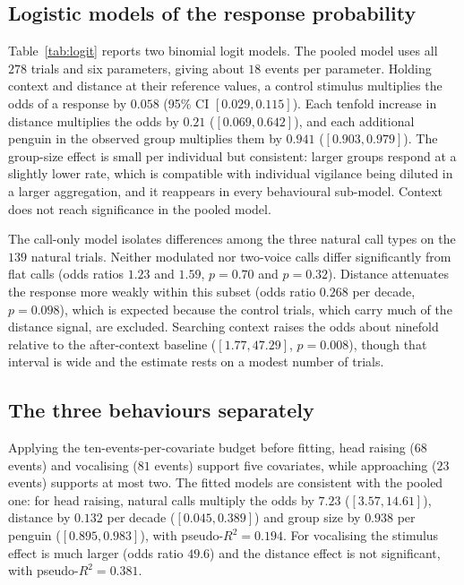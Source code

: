 \documentclass{apmcmthesis}
\begin{document}
\subsection{Logistic models of the response probability}

Table~\ref{tab:logit} reports two binomial logit models. The pooled model uses all $278$
trials and six parameters, giving about $18$ events per parameter. Holding context and
distance at their reference values, a control stimulus multiplies the odds of a response
by $0.058$ (95\% CI $[0.029,0.115]$). Each tenfold increase in distance multiplies the
odds by $0.21$ ($[0.069,0.642]$), and each additional penguin in the observed group
multiplies them by $0.941$ ($[0.903,0.979]$). The group-size effect is small per
individual but consistent: larger groups respond at a slightly lower rate, which is
compatible with individual vigilance being diluted in a larger aggregation, and it
reappears in every behavioural sub-model. Context does not reach significance in the
pooled model.



The call-only model isolates differences among the three natural call types on the $139$
natural trials. Neither modulated nor two-voice calls differ significantly from flat calls
(odds ratios $1.23$ and $1.59$, $p=0.70$ and $p=0.32$). Distance attenuates the response
more weakly within this subset (odds ratio $0.268$ per decade, $p=0.098$), which is
expected because the control trials, which carry much of the distance signal, are
excluded. Searching context raises the odds about ninefold relative to the after-context
baseline ($[1.77,47.29]$, $p=0.008$), though that interval is wide and the estimate rests
on a modest number of trials.

\subsection{The three behaviours separately}

Applying the ten-events-per-covariate budget before fitting, head raising ($68$ events)
and vocalising ($81$ events) support five covariates, while approaching ($23$ events)
supports at most two. The fitted models are consistent with the pooled one: for head
raising, natural calls multiply the odds by $7.23$ ($[3.57,14.61]$), distance by $0.132$
per decade ($[0.045,0.389]$) and group size by $0.938$ per penguin ($[0.895,0.983]$),
with pseudo-$R^2=0.194$. For vocalising the stimulus effect is much larger (odds ratio
$49.6$) and the distance effect is not significant, with pseudo-$R^2=0.381$.
\end{document}
